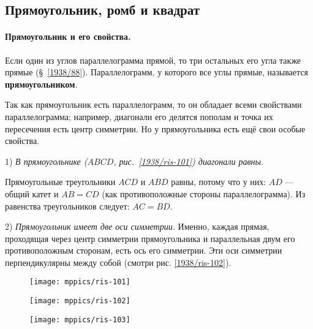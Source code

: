 \subsection*{Прямоугольник, ромб и квадрат}

\paragraph{Прямоугольник и его свойства.}\label{1938/92}
Если один из углов параллелограмма прямой, то три остальных его угла также прямые (§~\ref{1938/88}).
Параллелограмм, у которого все углы прямые, называется \textbf{прямоугольником}.

Так как прямоугольник есть параллелограмм, то он обладает всеми свойствами параллелограмма;
например, диагонали его делятся пополам и точка их пересечения есть центр симметрии.
Но у прямоугольника есть ещё свои особые свойства.

1) \emph{В прямоугольнике \emph{($ABCD$, рис.~\ref{1938/ris-101})} диагонали равны.}

Прямоугольные треугольники $ACD$ и $ABD$ равны, потому что у них:
$AD$ — общий катет и $AB=CD$ (как противоположные стороны параллелограмма).
Из равенства треугольников следует:
$AC = BD$.

2) \emph{Прямоугольник имеет две оси симметрии.}
Именно, каждая прямая, проходящая через центр симметрии прямоугольника и параллельная двум его противоположным сторонам, есть ось его симметрии.
Эти оси симметрии перпендикулярны между собой (смотри рис. \ref{1938/ris-102}).

\begin{figure}[h]
\begin{minipage}{.32\textwidth}
\centering
\texttt{[image: mppics/ris-101]}
\end{minipage}\hfill
\begin{minipage}{.32\textwidth}
\centering
\texttt{[image: mppics/ris-102]}
\end{minipage}\hfill
\begin{minipage}{.32\textwidth}
\centering
\texttt{[image: mppics/ris-103]}
\end{minipage}

\medskip

\begin{minipage}{.32\textwidth}
\centering
\caption{}\label{1938/ris-101}
\end{minipage}\hfill
\begin{minipage}{.32\textwidth}
\centering
\caption{}\label{1938/ris-102}
\end{minipage}\hfill
\begin{minipage}{.32\textwidth}
\centering
\caption{}\label{1938/ris-103}
\end{minipage}
\vskip-4mm
\end{figure} 

